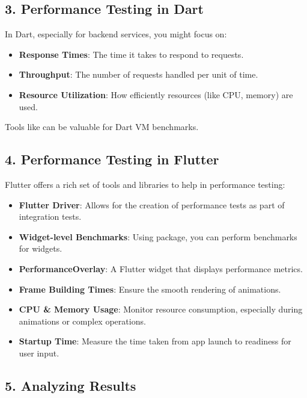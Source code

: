 \subsection*{3. Performance Testing in Dart}

In Dart, especially for backend services, you might focus on:

\begin{itemize}
 \item \textbf{Response Times}: The time it takes to respond to requests.
 \item \textbf{Throughput}: The number of requests handled per unit of time.
 \item \textbf{Resource Utilization}: How efficiently resources (like CPU, memory) are used.
\end{itemize}
Tools like  can be valuable for Dart VM benchmarks.

\subsection*{4. Performance Testing in Flutter}

Flutter offers a rich set of tools and libraries to help in performance testing:

\begin{itemize}
 \item \textbf{Flutter Driver}: Allows for the creation of performance tests as part of integration tests.
 \item \textbf{Widget-level Benchmarks}: Using  package, you can perform benchmarks for widgets.
 \item \textbf{PerformanceOverlay}: A Flutter widget that displays performance metrics.
\end{itemize}


\begin{itemize}
 \item \textbf{Frame Building Times}: Ensure the smooth rendering of animations.
 \item \textbf{CPU \& Memory Usage}: Monitor resource consumption, especially during animations or complex operations.
 \item \textbf{Startup Time}: Measure the time taken from app launch to readiness for user input.
\end{itemize}

\subsection*{5. Analyzing Results}

